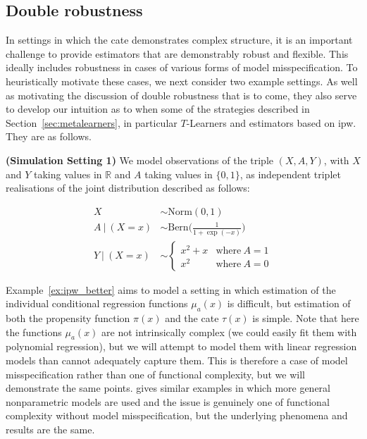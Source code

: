 \documentclass[../thesis.tex]{subfiles}
\begin{document}
\subsection{Double robustness} \label{sec:doublerobustness}
In settings in which the \gls{cate} demonstrates complex structure, it is an important challenge to provide estimators that are demonstrably robust and flexible. This ideally includes robustness in cases of various forms of model misspecification. To heuristically motivate these cases, we next consider two example settings. As well as motivating the discussion of double robustness that is to come, they also serve to develop our intuition as to when some of the strategies described in Section~\ref{sec:metalearners}, in particular $T$-Learners and estimators based on \gls{ipw}. They are as follows.

\begin{example}{\textbf{(Simulation Setting 1)}} \label{ex:ipw_better}
We model observations of the triple $(X, A, Y)$, with $X$ and $Y$ taking values in $\mathbb{R}$ and $A$ taking values in $\{0,1\}$, as independent triplet realisations of the joint distribution described as follows:

\begin{align*}
X & \sim \mathrm{Norm}(0, 1) \\    
A \ | \ (X = x) & \sim \mathrm{Bern}\Big(\frac{1}{1 + \exp(-x)}\Big) \\ 
Y \ | \ (X = x) & \sim \begin{cases}
      x^2 + x & \text{where} \ A = 1\\
      x^2 & \text{where} \ A = 0
    \end{cases}
\end{align*}
\end{example}

Example~\ref{ex:ipw_better} aims to model a setting in which estimation of the individual conditional regression functions $\mu_a(x)$ is difficult, but estimation of both the propensity function $\pi(x)$ and the \gls{cate} $\tau(x)$ is simple. Note that here the functions $\mu_a(x)$ are not intrinsically complex (we could easily fit them with polynomial regression), but we will attempt to model them with linear regression models than cannot adequately capture them. This is therefore a case of model misspecification rather than one of functional complexity, but we will demonstrate the same points. \citet{kennedy_towards_2022} gives similar examples in which more general nonparametric models are used and the issue is genuinely one of functional complexity without model misspecification, but the underlying phenomena and results are the same.
\end{document}

